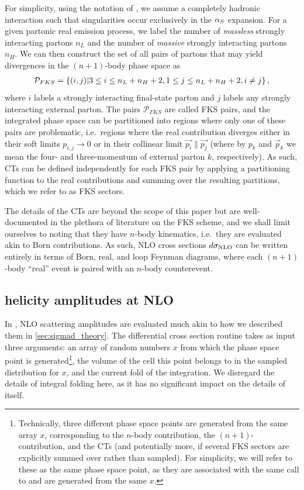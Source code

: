 \documentclass[a4paper,11pt]{article}
\begin{document}
For simplicity, using the notation of \cite{Frederix:2009yq}, we assume a completely hadronic interaction such that singularities occur exclusively in the $\alpha_S{}$ expansion. For a given partonic real emission process, we label the number of \textit{massless} strongly interacting partons $n_L$ and the number of \textit{massive} strongly interacting partons $n_H$. We can then construct the set of all pairs of partons that may yield divergences in the $(n+1)$-body phase space as
\begin{align}
    \mathcal{P}_{FKS} = \left\{ (i,j) {\Large{|}}  3  \leq i \leq n_L + n_H + 2, 1 \leq j \leq n_L + n_H + 2, i\neq j\right\},
\end{align}
where $i$ labels a strongly interacting final-state parton and $j$ labels any strongly interacting external parton. The pairs $\mathcal{P}_{FKS}$ are called FKS pairs, and the integrated phase space can be partitioned into regions where only one of these pairs are problematic, i.e.\ regions where the real contribution diverges either in their soft limits $p_{i,j}\to0$ or in their collinear limit $\vec{p_i} \parallel \vec{p_j}$ (where by $p_k$ and $\vec{p}_k$ we mean the four- and three-momentum of external parton $k$, respectively). As such, CTs can be defined independently for each FKS pair by applying a partitioning function to the real contributions and summing over the resulting partitions, which we refer to as FKS sectors.

The details of the CTs are beyond the scope of this paper but are well-documented in the plethora of literature on the FKS scheme, and we shall limit ourselves to noting that they have $n$-body kinematics, i.e.\ they are evaluated akin to Born contributions. As such, NLO cross sections $d\sigma_{\mathrm{NLO}}{}$ can be written entirely in terms of Born, real, and loop Feynman diagrams, where each $(n+1)$-body ``real'' event is paired with an $n$-body counterevent.


\subsection{\madgraph{} helicity amplitudes at NLO}
\label{sec:sigmad_code}


In \mg{}, NLO scattering amplitudes are evaluated much akin to how we described them in \cref{sec:sigmad_theory}. The differential cross section routine \sigintf takes as input three arguments: an array of random numbers $x$ from which the phase space point is generated\footnote{Technically, three different phase space points are generated from the same array $x$, corresponding to the $n$-body contribution, the $(n+1)$-contribution, and the CTs (and potentially more, if several FKS sectors are explicitly summed over rather than sampled). For simplicity, we will refer to these as the same phase space point, as they are associated with the same call to \sigintf and are generated from the same $x$.}, the volume of the cell this point belongs to in the sampled distribution for $x$, and the current fold of the integration. We disregard the details of integral folding here, as it has no significant impact on the details of \sigintf itself.
\end{document}

